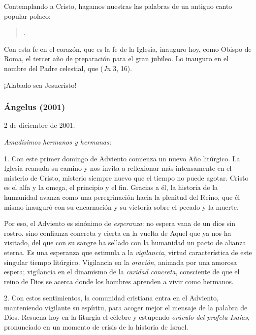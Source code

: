 \begin{body}
Contemplando a Cristo, hagamos nuestras las palabras de un antiguo canto popular polaco:

\begin{quote} . \end{quote}

Con esta fe en el corazón, que es la fe de la Iglesia, inauguro hoy, como Obispo de Roma, el tercer año de preparación para el gran jubileo. Lo inauguro en el nombre del Padre celestial, que  (\emph{Jn} 3, 16).

¡Alabado sea Jesucristo!

\subsubsection{Ángelus (2001)} 

2 de diciembre de 2001.



\emph{Amadísimos hermanos y hermanas:}

1. Con este primer domingo de Adviento comienza un nuevo Año litúrgico. La Iglesia reanuda su camino y nos invita a reflexionar más intensamente en el misterio de Cristo, misterio siempre nuevo que el tiempo no puede agotar. Cristo es el alfa y la omega, el principio y el fin. Gracias a él, la historia de la humanidad avanza como una peregrinación hacia la plenitud del Reino, que él mismo inauguró con su encarnación y su victoria sobre el pecado y la muerte.

Por eso, el Adviento es sinónimo de \emph{esperanza}: no espera vana de un dios sin rostro, sino confianza concreta y cierta en la vuelta de Aquel que ya nos ha visitado, del  que con su sangre ha sellado con la humanidad un pacto de alianza eterna. Es una esperanza que estimula a la \emph{vigilancia}, virtud característica de este singular tiempo litúrgico. Vigilancia en la \emph{oración}, animada por una amorosa espera; vigilancia en el dinamismo de la \emph{caridad concreta}, consciente de que el reino de Dios se acerca donde los hombres aprenden a vivir como hermanos.

2. Con estos sentimientos, la comunidad cristiana entra en el Adviento, manteniendo vigilante su espíritu, para acoger mejor el mensaje de la palabra de Dios. Resuena hoy en la liturgia el célebre y estupendo \emph{oráculo del profeta Isaías}, pronunciado en un momento de crisis de la historia de Israel.


\end{body}
